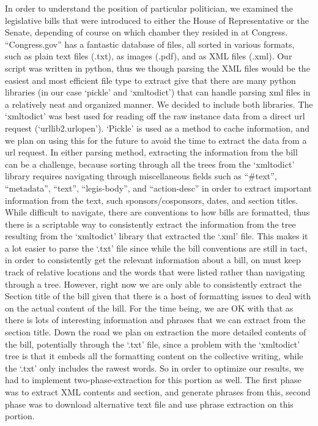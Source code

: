 \documentclass[12pt]{article}
\begin{document}
\par{In order to understand the position of particular politician, we examined the legislative bills that were introduced to either the House of Representative or the Senate, depending of course on which chamber they resided in at Congress. “Congress.gov” has a fantastic database of files, all sorted in various formats, such as plain text files (.txt), as images (.pdf), and as XML files (.xml). Our script was written in python, thus we though parsing the XML files would be the easiest and most efficient file type to extract give that there are many python libraries (in our case ‘pickle’ and ‘xmltodict’) that can handle parsing xml files in a relatively neat and organized manner. We decided to include both libraries. The ‘xmltodict’ was best used for reading off the raw instance data from a direct url request (‘urllib2.urlopen’). ‘Pickle’ is used as a method to cache information, and we plan on using this for the future to avoid the time to extract the data from a url request. In either parsing method, extracting the information from the bill can be a challenge, because sorting through all the trees from the ‘xmltodict’ library requires navigating through miscellaneous fields such as “\#text”, “metadata”, “text”, “legis-body”, and “action-desc” in order to extract important information from the text, such sponsors/cosponsors, dates, and section titles. While difficult to navigate, there are conventions to how bills are formatted, thus there is a scriptable way to consistently extract the information from the tree resulting from the ‘xmltodict’ library that extracted the ‘.xml’ file. This makes it a lot easier to parse the ‘.txt’ file since while the bill conventions are still in tact, in order to consistently get the relevant information about a bill, on must keep track of relative locations and the words that were listed rather than navigating through a tree. However, right now we are only able to consistently extract the Section title of the bill given that there is a host of formatting issues to deal with on the actual content of the bill. For the time being, we are OK with that as there is lots of interesting information and phrases that we can extract from the section title. Down the road we plan on extraction the more detailed contents of the bill, potentially through the ‘.txt’ file, since a problem with the ‘xmltodict’ tree is that it embeds all the formatting content on the collective writing, while the ‘.txt’ only includes the rawest words. So in order to optimize our results, we had to implement two-phase-extraction for this portion as well. The first phase was to extract XML contents and section, and generate phrases from this, second phase was to download alternative text file and use phrase extraction on this portion.}
\end{document}

